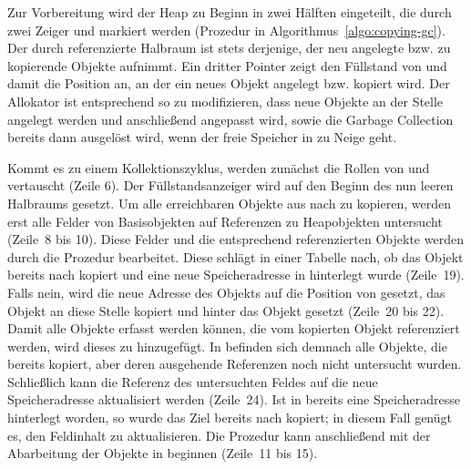 Zur Vorbereitung wird der Heap zu Beginn in zwei Hälften eingeteilt, die durch zwei Zeiger  und  markiert werden (Prozedur  in Algorithmus~\ref{algo:copying-gc}).
Der durch  referenzierte Halbraum ist stets derjenige, der neu angelegte bzw. zu kopierende Objekte aufnimmt.
Ein dritter Pointer  zeigt den Füllstand von  und damit die Position an, an der ein neues Objekt angelegt bzw. kopiert wird.
Der Allokator ist entsprechend so zu modifizieren, dass neue Objekte an der Stelle  angelegt werden und  anschließend angepasst wird, sowie die Garbage Collection bereits dann ausgelöst wird, wenn der freie Speicher in  zu Neige geht.

Kommt es zu einem Kollektionszyklus, werden zunächst die Rollen von  und  vertauscht (Zeile 6).
Der Füllstandsanzeiger  wird auf den Beginn des nun leeren Halbraums  gesetzt.
Um alle erreichbaren Objekte aus  nach  zu kopieren, werden erst alle Felder von Basisobjekten auf Referenzen zu Heapobjekten untersucht (Zeile~8 bis 10).
Diese Felder und die entsprechend referenzierten Objekte werden durch die Prozedur  bearbeitet.
Diese schlägt in einer Tabelle  nach, ob das Objekt bereits nach  kopiert und eine neue Speicheradresse in  hinterlegt wurde (Zeile~19).
Falls nein, wird die neue Adresse des Objekts auf die Position von  gesetzt, das Objekt an diese Stelle kopiert und  hinter das Objekt gesetzt (Zeile~20 bis 22).
Damit alle Objekte erfasst werden können, die vom kopierten Objekt referenziert werden, wird dieses zu  hinzugefügt.
In  befinden sich demnach alle Objekte, die bereits kopiert, aber deren ausgehende Referenzen noch nicht untersucht wurden.
Schließlich kann die Referenz des untersuchten Feldes auf die neue Speicheradresse aktualisiert werden (Zeile~24).
Ist in  bereits eine Speicheradresse hinterlegt worden, so wurde das Ziel bereits nach  kopiert; in diesem Fall genügt es, den Feldinhalt zu aktualisieren.
Die Prozedur  kann anschließend mit der Abarbeitung der Objekte in  beginnen (Zeile~11 bis 15).

